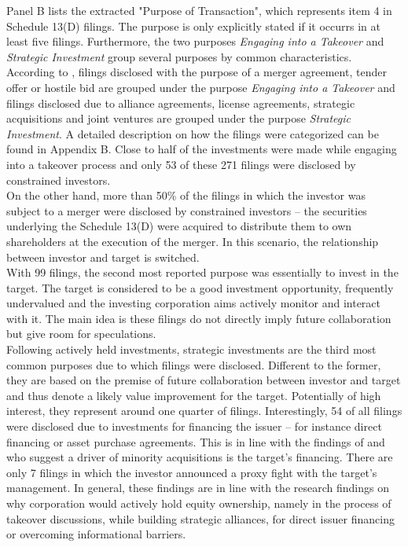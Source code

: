\documentclass[12pt]{article}
\begin{document}
Panel B lists the extracted "Purpose of Transaction", which represents item 4 in Schedule 13(D) filings. The purpose is only explicitly stated if it occurrs in at least five filings. Furthermore, the two purposes \emph{Engaging into a Takeover} and \emph{Strategic Investment} group several purposes by common characteristics. According to \citet[p.1]{Betton2008}, filings disclosed with the purpose of a merger agreement, tender offer or hostile bid are grouped under the purpose \emph{Engaging into a Takeover} and filings disclosed due to alliance agreements, license agreements, strategic acquisitions and joint ventures are grouped under the purpose \emph{Strategic Investment}. A detailed description on how the filings were categorized can be found in Appendix B. 
Close to half of the investments were made while engaging into a takeover process and only 53 of these 271 filings were disclosed by constrained investors.\\
On the other hand, more than 50\% of the filings in which the investor was subject to a merger were disclosed by constrained investors -- the securities underlying the Schedule 13(D) were acquired to distribute them to own shareholders at the execution of the merger. In this scenario, the relationship between investor and target is switched.\\
With 99 filings, the second most reported purpose was essentially to invest in the target. The target is considered to be a good investment opportunity, frequently undervalued and the investing corporation aims actively monitor and interact with it. The main idea is these filings do not directly imply future collaboration but give room for speculations.\\
Following actively held investments, strategic investments are the third most common purposes due to which filings were disclosed. Different to the former, they are based on the premise of future collaboration between investor and target and thus denote a likely value improvement for the target. Potentially of high interest, they represent around one quarter of filings. Interestingly, 54 of all filings were disclosed due to investments for financing the issuer -- for instance direct financing or asset purchase agreements. This is in line with the findings of \citet[p.2792]{Allen2000} and \citet[p.78]{Liao2014} who suggest a driver of minority acquisitions is the target's financing. There are only 7 filings in which the investor announced a proxy fight with the target's management. In general, these findings are in line with the research findings on why corporation would actively hold equity ownership, namely in the process of takeover discussions, while building strategic alliances, for direct issuer financing or overcoming informational barriers.
\end{document}
